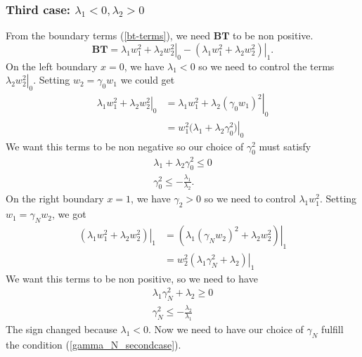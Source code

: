 \documentclass{article}
\theoremstyle{definition}
\begin{document}
        \subsubsection{Third case: $\lambda_1 <0, \lambda_2 >0$}
        From the boundary terms (\ref{bt-terms}), we need $\mathbf{BT}$ to be non positive.  
        \begin{equation}
            \textbf{BT} 
            = \left.\lambda_1 w_1^2 + \lambda_2 w_2^2\right\vert_0
            - \left.(\lambda_1 w_1^2 + \lambda_2 w_2^2)\right\vert_1. 
        \end{equation}
        On the left boundary $x=0$, we have $\lambda_1 <0$ so we need to control the terms 
        $\left.\lambda_2 w_2^2\right\vert_0$.
        Setting $w_2 = \gamma_0 w_1$ we could get
        \begin{align}
            \left.\lambda_1 w_1^2 + \lambda_2 w_2^2\right\vert_0 
                &= \left.\lambda_1 w_1^2 + \lambda_2 ( \gamma_0 w_1)^2\right\vert_0 \\
                &= w_1^2 (\left.\lambda_1 + \lambda_2  \gamma_0 ^2)\right\vert_0 
        \end{align}
        We want this terms to be  non negative so our choice of $\gamma_0^2$ must satisfy 
        \begin{align}
            \lambda_1 + \lambda_2  \gamma_0 ^2 \leq 0 \\
             \gamma_0^2 \leq - \frac{\lambda_1 }{\lambda_2}. \label{gamma_0_secondcase}
        \end{align}
        On the right boundary $x=1$, we have $\gamma_2 >0$ so we need to control $\lambda_1 w_1^2$.
        Setting $w_1 = \gamma_N w_2$, we got 
        \begin{align}
            \left.(\lambda_1 w_1^2 + \lambda_2 w_2^2)\right\vert_1 
            &= \left.(\lambda_1 (\gamma_N w_2)^2 + \lambda_2 w_2^2)\right\vert_1 \\
            &= \left. w_2^2(\lambda_1 \gamma_N^2 + \lambda_2 )\right\vert_1 
        \end{align}
        We want this terms to be non positive, so we need to have 
        \begin{align}
            \lambda_1 \gamma_N^2 + \lambda_2 \geq 0\\
            \gamma_N^2 \leq -\frac{\lambda_2}{\lambda_1} \label{gamma_N_secondcase}
        \end{align}
        The sign changed because $\lambda_1 <0$. Now we need to have our choice of $\gamma_N$ 
        fulfill the condition (\ref{gamma_N_secondcase}).
\end{document}
